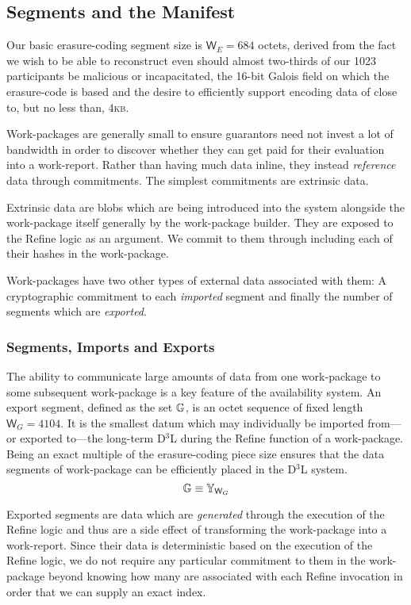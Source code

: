 \subsection{Segments and the Manifest}

Our basic erasure-coding segment size is $\mathsf{W}_E = 684$ octets, derived from the fact we wish to be able to reconstruct even should almost two-thirds of our 1023 participants be malicious or incapacitated, the 16-bit Galois field on which the erasure-code is based and the desire to efficiently support encoding data of close to, but no less than, 4\textsc{kb}.

Work-packages are generally small to ensure guarantors need not invest a lot of bandwidth in order to discover whether they can get paid for their evaluation into a work-report. Rather than having much data inline, they instead \emph{reference} data through commitments. The simplest commitments are extrinsic data.

Extrinsic data are blobs which are being introduced into the system alongside the work-package itself generally by the work-package builder. They are exposed to the Refine logic as an argument. We commit to them through including each of their hashes in the work-package.

Work-packages have two other types of external data associated with them: A cryptographic commitment to each \emph{imported} segment and finally the number of segments which are \emph{exported}.

\subsubsection{Segments, Imports and Exports}

The ability to communicate large amounts of data from one work-package to some subsequent work-package is a key feature of the \Jam availability system. An export segment, defined as the set $\mathbb{G}$, is an octet sequence of fixed length $\mathsf{W}_G = 4104$. It is the smallest datum which may individually be imported from---or exported to---the long-term D$^3$L during the Refine function of a work-package. Being an exact multiple of the erasure-coding piece size ensures that the data segments of work-package can be efficiently placed in the D$^3$L system.
\begin{equation}\label{eq:segment}
  \mathbb{G} \equiv \mathbb{Y}_{\mathsf{W}_G}
\end{equation}

Exported segments are data which are \emph{generated} through the execution of the Refine logic and thus are a side effect of transforming the work-package into a work-report. Since their data is deterministic based on the execution of the Refine logic, we do not require any particular commitment to them in the work-package beyond knowing how many are associated with each Refine invocation in order that we can supply an exact index.

